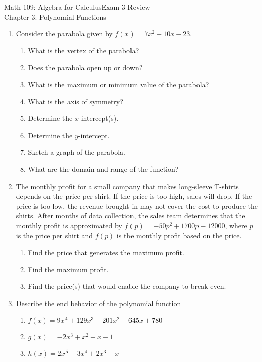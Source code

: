 \documentclass[12pt]{article}
\begin{document}
	\noindent Math 109: Algebra for Calculus\hfill Exam 3 Review\\
	\mbox{}\hfill Chapter 3: Polynomial Functions
	\setcounter{page}{1}
	\fancyfoot[C]{\thepage}
\begin{enumerate}
	\item Consider the parabola given by $f(x)=7x^2+10x-23$.
		\begin{enumerate}
			\item What is the vertex of the parabola?
			\vfill
			\item Does the parabola open up or down?\vfill
			\item What is the maximum or minimum value of the parabola?\vfill
			\item What is the axis of symmetry?\vfill
			\item Determine the $x$-intercept(s).\vfill
			\item Determine the $y$-intercept.\vfill
			\item Sketch a graph of the parabola.
				\vskip 2in
			\item What are the domain and range of the function?\vfill
		\end{enumerate}
	\newpage
	\item The monthly profit for a small company that makes long-sleeve T-shirts depends on the price per shirt. If the price is too high, sales will drop. If the price is too low, the revenue brought in may not cover the cost to produce the shirts. After months of data collection, the sales team determines that the  monthly profit is approximated by $f(p)=-50p^2+1700p-12000$, where $p$ is the price per shirt and $f(p)$ is the monthly profit based on the price.
		\begin{enumerate}
			\item Find the price that generates the maximum profit.
			\vskip 1in
			\item Find the maximum profit.
			\vskip 1in
			\item Find the price(s) that would enable the company to break even.
			\vskip 1in
		\end{enumerate}
	\item Describe the end behavior of the polynomial function 
		\begin{enumerate}
			\item $f(x)=9x^{4} + 129x^{3} + 201x^{2} + 645x + 780$
				\vfill
			\item $g(x)=-2x^{3} + x^{2} - x - 1$
				\vfill
			\item $h(x)=2x^{5} - 3x^{4} + 2x^{3} - x$

\end{enumerate}
\end{enumerate}
\end{document}
